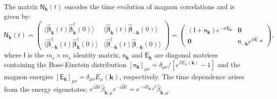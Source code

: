 \documentclass[aps, prx, nofootinbib, superscriptaddress]{revtex4-2}
\begin{document}
The matrix $\mathsf{N}_{\mathbf{k}}(t)$ encodes the time evolution of magnon correlations and is given by:
\begin{equation}
    \mathsf{N}_{\mathbf{k}}(t) 
    = 
    \begin{pmatrix}
        \langle \hat{\boldsymbol{\beta}}_{\mathbf{k}}(t) \hat{\boldsymbol{\beta}}_{\mathbf{k}}^{\dagger}(0) \rangle & \langle \hat{\boldsymbol{\beta}}_{\mathbf{k}}(t) \hat{\boldsymbol{\beta}}_{-\mathbf{k}}(0) \rangle \\
        \langle \hat{\boldsymbol{\beta}}_{-\mathbf{k}}^{\dagger}(t) \hat{\boldsymbol{\beta}}_{\mathbf{k}}^{\dagger}(0) \rangle & \langle \hat{\boldsymbol{\beta}}_{-\mathbf{k}}^{\dagger}(t) \hat{\boldsymbol{\beta}}_{-\mathbf{k}}(0) \rangle
    \end{pmatrix}
    = 
    \begin{pmatrix}
        (\mathsf{I} + \mathsf{n}_{\mathbf{k}})e^{-it\mathsf{E}_{\mathbf{k}}} & \mathbf{0} \\
        \mathbf{0} & \mathsf{n}_{-\mathbf{k}}e^{it\mathsf{E}_{-\mathbf{k}}}
    \end{pmatrix},
\end{equation}
where $\mathsf{I}$ is the $m_s \times m_s$ identity matrix, $\mathsf{n}_{\mathbf{k}}$ and $\mathsf{E}_{\mathbf{k}}$ are diagonal matrices containing the Bose-Einstein distribution $[\mathsf{n}_{\mathbf{k}}]_{\mu\nu} = \delta_{\mu\nu}/[e^{\beta E_\mu(\mathbf{k})} - 1]$ and the magnon energies $[\mathsf{E}_{\mathbf{k}}]_{\mu\nu} = \delta_{\mu\nu}E_{\mu}(\mathbf{k})$, respectively. The time dependence arises from the energy eigenstates: $e^{i\hat{H}t}\hat{\beta}_{\mathbf{k},\mu}e^{-i\hat{H}t} = e^{-iE_{\mathbf{k},\mu}t}\hat{\beta}_{\mathbf{k},\mu}$.
\end{document}
